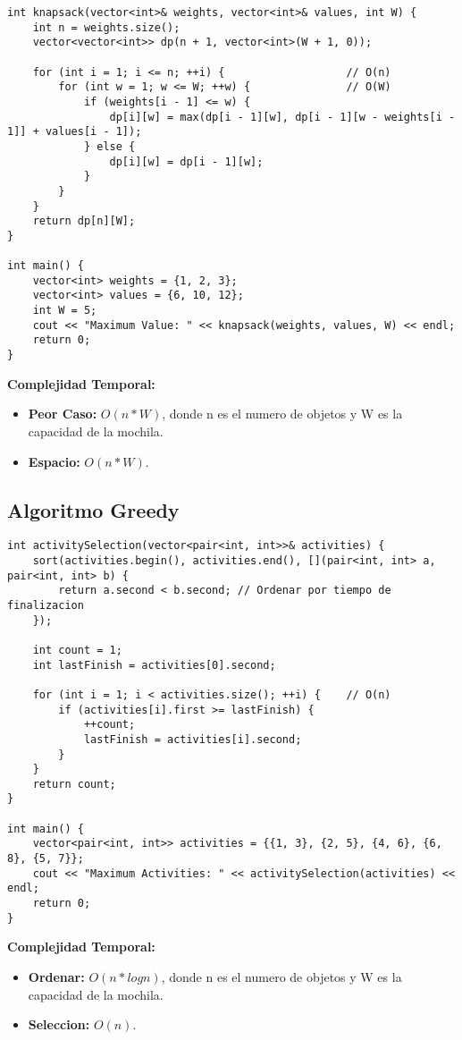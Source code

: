     
    \begin{lstlisting}[style=cpp]
int knapsack(vector<int>& weights, vector<int>& values, int W) {
    int n = weights.size();
    vector<vector<int>> dp(n + 1, vector<int>(W + 1, 0));

    for (int i = 1; i <= n; ++i) {                   // O(n)
        for (int w = 1; w <= W; ++w) {               // O(W)
            if (weights[i - 1] <= w) {
                dp[i][w] = max(dp[i - 1][w], dp[i - 1][w - weights[i - 1]] + values[i - 1]);
            } else {
                dp[i][w] = dp[i - 1][w];
            }
        }
    }
    return dp[n][W];
}

int main() {
    vector<int> weights = {1, 2, 3};
    vector<int> values = {6, 10, 12};
    int W = 5;
    cout << "Maximum Value: " << knapsack(weights, values, W) << endl;
    return 0;
}

    \end{lstlisting}
    \textbf{Complejidad Temporal: }
    \begin{itemize}
        \item \textbf{Peor Caso: }$O(n *W)$, donde n es el numero de objetos y W es la capacidad de la mochila.
        \item \textbf{Espacio: }$O(n*W).$
    \end{itemize}

\subsection{Algoritmo Greedy}
    \begin{lstlisting}[style=cpp]
int activitySelection(vector<pair<int, int>>& activities) {
    sort(activities.begin(), activities.end(), [](pair<int, int> a, pair<int, int> b) {
        return a.second < b.second; // Ordenar por tiempo de finalizacion
    });

    int count = 1;
    int lastFinish = activities[0].second;

    for (int i = 1; i < activities.size(); ++i) {    // O(n)
        if (activities[i].first >= lastFinish) {
            ++count;
            lastFinish = activities[i].second;
        }
    }
    return count;
}

int main() {
    vector<pair<int, int>> activities = {{1, 3}, {2, 5}, {4, 6}, {6, 8}, {5, 7}};
    cout << "Maximum Activities: " << activitySelection(activities) << endl;
    return 0;
}
    \end{lstlisting}
    \textbf{Complejidad Temporal: }
    \begin{itemize}
        \item \textbf{Ordenar: }$O(n*logn)$, donde n es el numero de objetos y W es la capacidad de la mochila.
        \item \textbf{Seleccion: }$O(n).$
    \end{itemize}

